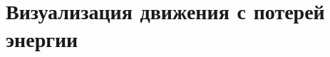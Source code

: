 \newpage
\section[Визуализация движения с потерей энергии]{Визуализация движения с потерей энергии}
